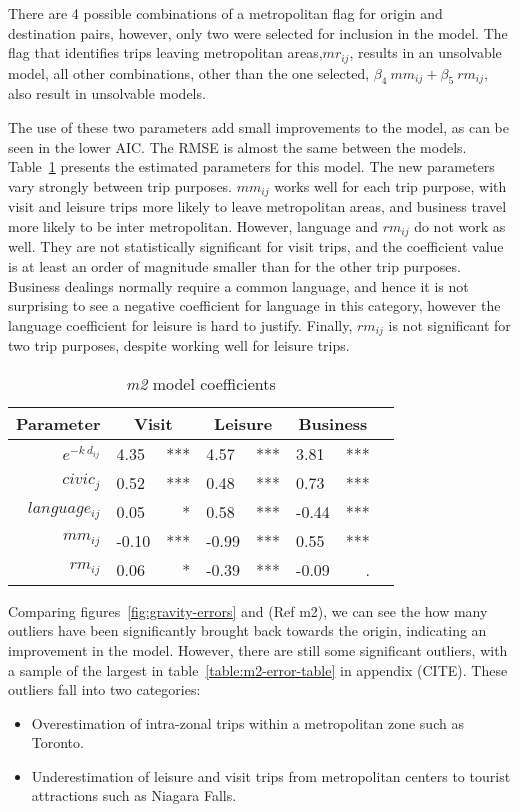 There are 4 possible combinations of a metropolitan flag for origin and destination pairs, however, only two were selected for inclusion in the model. The flag that identifies trips leaving metropolitan areas,$mr_{ij}$, results in an unsolvable model, all other combinations, other than the one selected, $\beta_4~mm_{ij} + \beta_5~rm_{ij}$, also result in unsolvable models. 

The use of these two parameters add small improvements to the model, as can be seen in the lower AIC. The RMSE is almost the same between the models. Table~\ref{table:m2-coeff} presents the estimated parameters for this model. The new parameters vary strongly between trip purposes. 
$mm_{ij}$  works well for each trip purpose, with visit and leisure trips more likely to leave metropolitan areas, and business travel more likely to be inter metropolitan. However, language and $rm_{ij}$  do not work as well. They are not statistically significant for visit trips, and the coefficient value is at least an order of magnitude smaller than for the other trip purposes. Business dealings normally require a common language, and hence it is not surprising to see a negative coefficient for language in this category, however the language coefficient for leisure is hard to justify. Finally, $rm_{ij}$  is not significant for two trip purposes, despite working well for leisure trips. 

\begin{table}[H]
\centering
\caption{\textit{m2} model coefficients}
\label{table:m2-coeff}
\begin{tabular}{@{}rlrlrlrl@{}}
  \toprule
 Parameter & \multicolumn{2}{c}{Visit} & \multicolumn{2}{c}{Leisure} & \multicolumn{2}{c}{Business} &  \\ \midrule
  $e^{-k\ d_{ij}}$ 	& 4.35 & *** & 4.57 & *** & 3.81 & *** \\  
  $civic_j$ 		& 0.52 	& *** & 0.48 & *** & 0.73 & *** \\  
  $language_{ij}$ 	& 0.05 & * & 0.58 & *** & -0.44 & *** \\ 
  $mm_{ij}$  		& -0.10 & *** & -0.99 & *** & 0.55 & *** \\ 
  $rm_{ij}$			& 0.06 & * & -0.39 & *** & -0.09 & . \\  
   \bottomrule
\end{tabular}
\end{table}

Comparing figures~\ref{fig:gravity-errors} and (Ref m2), we can see the how many outliers have been significantly brought back towards the origin, indicating an improvement in the model. However, there are still some significant outliers, with a sample of the largest in table~\ref{table:m2-error-table} in appendix (CITE). These outliers fall into two categories:
\begin{itemize}
\item Overestimation of intra-zonal trips within a metropolitan zone such as Toronto.
\item Underestimation of leisure and visit trips from metropolitan centers to tourist attractions such as Niagara Falls.
\end{itemize}

